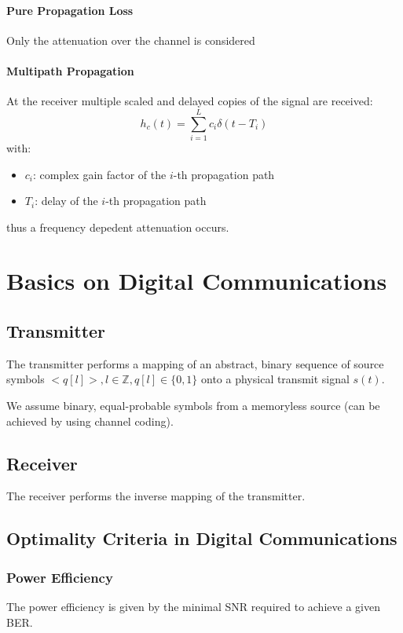 \paragraph{Pure Propagation Loss}
Only the attenuation over the channel is considered

\paragraph{Multipath Propagation}
At the receiver multiple scaled and delayed copies of the signal are received:
\begin{equation}
    h_c(t) = \sum_{i=1}^L c_i \delta(t - T_i)
\end{equation}
with:
\begin{itemize}
    \item $c_i$: complex gain factor of the $i$-th propagation path
    \item $T_i$: delay of the $i$-th propagation path
\end{itemize}

thus a frequency depedent attenuation occurs.

\section{Basics on Digital Communications}
\subsection{Transmitter}
The transmitter performs a mapping of an abstract, binary sequence of source symbols
$<q[l]>, l \in \mathbb{Z}, q[l] \in \{0, 1\}$ onto a physical transmit signal $s(t)$.

We assume binary, equal-probable symbols from a memoryless source (can be achieved by using
channel coding).

\subsection{Receiver}
The receiver performs the inverse mapping of the transmitter.

\subsection{Optimality Criteria in Digital Communications}
\subsubsection{Power Efficiency}
The power efficiency is given by the minimal SNR required to achieve a given BER.

